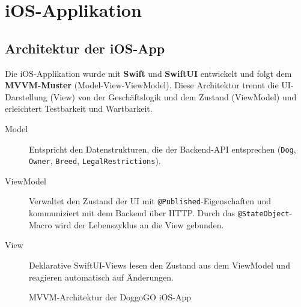 \chapter{iOS-Applikation}
\label{chap:ios}

\section{Architektur der iOS-App}
\label{sec:ios-architektur}

Die iOS-Applikation wurde mit \textbf{Swift} und \textbf{SwiftUI} entwickelt und folgt
dem \textbf{MVVM-Muster} (Model-View-ViewModel). Diese Architektur trennt die
UI-Darstellung (View) von der Geschäftslogik und dem Zustand (ViewModel) und erleichtert
Testbarkeit und Wartbarkeit.

\begin{description}
  \item[Model] Entspricht den Datenstrukturen, die der Backend-API entsprechen
    (\texttt{Dog}, \texttt{Owner}, \texttt{Breed}, \texttt{LegalRestrictions}).
  \item[ViewModel] Verwaltet den Zustand der UI mit \texttt{@Published}-Eigenschaften
    und kommuniziert mit dem Backend über HTTP. Durch das \texttt{@StateObject}-Macro
    wird der Lebenszyklus an die View gebunden.
  \item[View] Deklarative SwiftUI-Views lesen den Zustand aus dem ViewModel und reagieren
    automatisch auf Änderungen.
\end{description}

\begin{figure}[H]
  \centering
  \caption{MVVM-Architektur der DoggoGO iOS-App}
  \label{fig:mvvm}
\end{figure}

